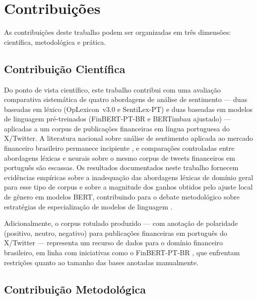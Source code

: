 
\section{Contribuições}
\label{sec:contribuicoes}

As contribuições deste trabalho podem ser organizadas em três dimensões: científica, metodológica e prática.

\subsection{Contribuição Científica}
\label{subsec:contrib_cientifica}

Do ponto de vista científico, este trabalho contribui com uma avaliação comparativa sistemática de quatro abordagens de análise de sentimento --- duas baseadas em léxico (OpLexicon~v3.0 e SentiLex-PT) e duas baseadas em modelos de linguagem pré-treinados (FinBERT-PT-BR e BERTimbau ajustado) --- aplicadas a um corpus de publicações financeiras em língua portuguesa do X/Twitter. A literatura nacional sobre análise de sentimento aplicada ao mercado financeiro brasileiro permanece incipiente \cite{galdi2018}, e comparações controladas entre abordagens léxicas e neurais sobre o mesmo corpus de tweets financeiros em português são escassas. Os resultados documentados neste trabalho fornecem evidências empíricas sobre a inadequação das abordagens léxicas de domínio geral para esse tipo de corpus e sobre a magnitude dos ganhos obtidos pelo ajuste local de gênero em modelos BERT, contribuindo para o debate metodológico sobre estratégias de especialização de modelos de linguagem \cite{devlin2019,santos2023finbert}.

Adicionalmente, o corpus rotulado produzido --- com anotação de polaridade (positivo, neutro, negativo) para publicações financeiras em português do X/Twitter --- representa um recurso de dados para o domínio financeiro brasileiro, em linha com iniciativas como o FinBERT-PT-BR \cite{santos2023finbert}, que enfrentam restrições quanto ao tamanho das bases anotadas manualmente.

\subsection{Contribuição Metodológica}
\label{subsec:contrib_metodologica}

